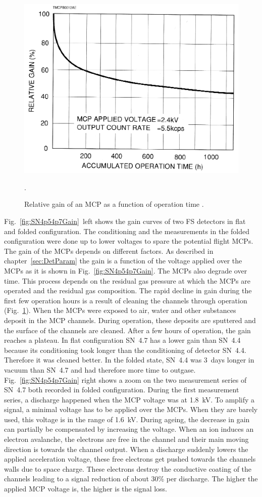 		\begin{figure}[H] %
	\centering
	\includegraphics[width=.5\textwidth]{Experiments/MCP_relGain_timeevol.png}
	\caption{Relative gain of an MCP as a function of operation time \cite{LecNot_Wurz2017}.}
	\label{fig:MCPrelGainTime}.
\end{figure}
	Fig.~\ref{fig:SN4p54p7Gain}~left shows the gain curves of two FS detectors in flat and folded configuration. The conditioning and the measurements in the folded configuration were done up to lower voltages to spare the potential flight MCPs. The gain of the MCPs depends on different factors. As described in chapter~\ref{sec:DetParam} the gain is a function of the voltage applied over the MCPs as it is shown in Fig.~\ref{fig:SN4p54p7Gain}. 
	The MCPs also degrade over time. This process depends on the residual gas pressure at which the MCPs are operated and the residual gas composition. The rapid decline in gain during the first few operation hours is a result of cleaning the channels through operation (Fig.~\ref{fig:MCPrelGainTime}).
	When the MCPs were exposed to air, water and other substances deposit in the MCP channels. During operation, these deposits are sputtered and the surface of the channels are cleaned. After a few hours of operation, the gain reaches a plateau. In flat configuration SN~4.7 has a lower gain than SN~4.4 because its conditioning took longer than the conditioning of detector SN~4.4. Therefore it was cleaned better. In the folded state, SN~4.4 was 3~days longer in vacuum than SN~4.7 and had therefore more time to outgase. Fig.~\ref{fig:SN4p54p7Gain} right shows a zoom on the two measurement series of SN~4.7 both recorded in folded configuration. During the first measurement series, a discharge happened when the MCP voltage was at 1.8~kV. To amplify a signal, a minimal voltage has to be applied over the MCPs. When they are barely used, this voltage is in the range of 1.6~kV. During ageing, the decrease in gain can partially be compensated by increasing the voltage. When an ion induces an electron avalanche, the electrons are free in the channel and their main moving direction is towards the channel output. When a discharge suddenly lowers the applied acceleration voltage, these free electrons get pushed towards the channels walls due to space charge. These electrons destroy the conductive coating of the channels leading to a signal reduction of about 30\% per discharge. The higher the applied MCP voltage is, the higher is the signal loss.\\
